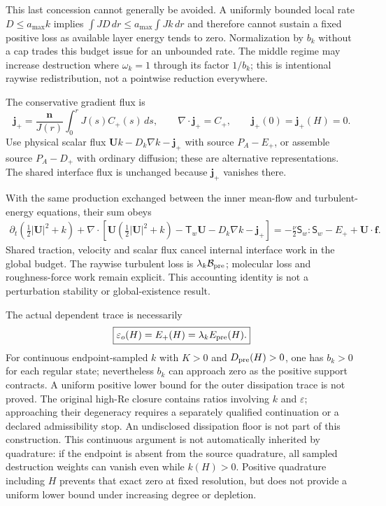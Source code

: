 \documentclass[11pt,a4paper]{article}
\numberwithin{equation}{section}
\begin{document}
This last concession cannot generally be avoided. A uniformly bounded
local rate $D\leq a_{\max}k$ implies
$\int JD\,dr\leq a_{\max}\int Jk\,dr$ and therefore cannot sustain
a fixed positive loss as available layer energy tends to zero.
Normalization by $b_k$ without a cap trades this budget issue for an
unbounded rate. The middle regime may increase destruction where
$\omega_k=1$ through its factor $1/b_k$; this is intentional raywise
redistribution, not a pointwise reduction everywhere.

The conservative gradient flux is
\begin{equation}
 \bm j_+=\frac{\bm n}{J(r)}\int_0^rJ(s)C_+(s)\,ds,
 \qquad \nabla\cdot\bm j_+=C_+,\qquad
 \bm j_+(0)=\bm j_+(H)=0.
 \label{eq:wj-wall-positive-flux}
\end{equation}
Use physical scalar flux $\bm U k-D_k\nabla k-\bm j_+$ with source
$P_A-E_+$, or assemble source $P_A-D_+$ with ordinary diffusion;
these are alternative representations. The shared interface flux is
unchanged because $\bm j_+$ vanishes there.

With the same production exchanged between the inner mean-flow and
turbulent-energy equations, their sum obeys
\begin{equation}
 \begin{aligned}
 \partial_t\left(\tfrac12|\bm U|^2+k\right)
 +\nabla\cdot\left[\bm U\left(\tfrac12|\bm U|^2+k\right)
 -\mathsf T_w\bm U-D_k\nabla k-\bm j_+\right]
 =-\tfrac\nu2\mathsf S_w:\mathsf S_w-E_++\bm U\cdot\bm f.
 \end{aligned}
 \label{eq:wj-wall-positive-energy}
\end{equation}
Shared traction, velocity and scalar flux cancel internal interface
work in the global budget. The raywise turbulent loss is
$\lambda_k\mathcal B_{\rm pre}$; molecular loss and roughness-force
work remain explicit. This accounting identity is not a perturbation
stability or global-existence result.

The actual dependent trace is necessarily
\begin{equation}
 \boxed{\varepsilon_o(H)=E_+(H)=\lambda_kE_{\rm pre}(H).}
 \label{eq:wj-wall-positive-trace}
\end{equation}
For continuous endpoint-sampled $k$ with $K>0$ and $D_{\rm pre}(H)>0$,
one has $b_k>0$ for each regular state; nevertheless $b_k$ can approach
zero as the positive support contracts. A uniform positive lower bound
for the outer dissipation trace is not proved. The original high-Re
closure contains ratios involving $k$ and $\varepsilon$; approaching
their degeneracy requires a separately qualified continuation or a
declared admissibility stop. An undisclosed dissipation floor is not
part of this construction.
This continuous argument is not automatically inherited by quadrature:
if the endpoint is absent from the source quadrature, all sampled
destruction weights can vanish even while $k(H)>0$. Positive quadrature
including $H$ prevents that exact zero at fixed resolution, but does not
provide a uniform lower bound under increasing degree or depletion.
\end{document}
